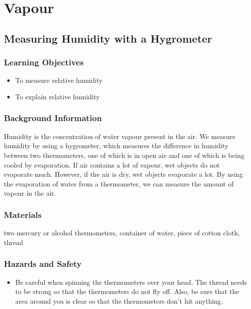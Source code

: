 \section{Vapour}

\subsection{Measuring Humidity with a Hygrometer}

\subsubsection*{Learning Objectives}
\begin{itemize}
\item{To measure relative humidity}
\item{To explain relative humidity}
\end{itemize}

\subsubsection*{Background Information}
Humidity is the concentration of water vapour present in the air.  We measure humidity by using a hygrometer, which measures the difference in humidity between two thermometers, one of which is in open air and one of which is being cooled by evaporation.  If air contains a lot of vapour, wet objects do not evaporate much.  However, if the air is dry, wet objects evaporate a lot.  By using the evaporation of water from a thermometer, we can measure the amount of vapour in the air.

\subsubsection*{Materials}
two mercury or alcohol thermometers, container of water, piece of cotton cloth, thread

\subsubsection*{Hazards and Safety}
\begin{itemize}
\item{Be careful when spinning the thermometers over your head.  The thread needs to be strong so that the thermometers do not fly off.  Also, be sure that the area around you is clear so that the thermometers don't hit anything.}
\end{itemize}

